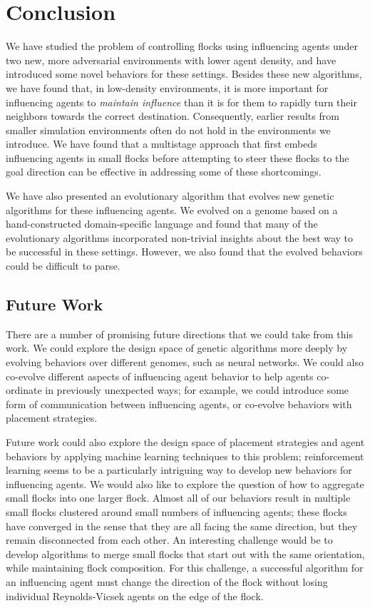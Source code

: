 \chapter{Conclusion}
\label{ch:conclusion}

We have studied the problem of controlling flocks using influencing agents
under two new, more adversarial environments with lower agent density, and
have introduced some novel behaviors for these settings.
Besides these new algorithms, we have found that, in low-density
environments, it is more important for influencing agents to
\textit{maintain influence} than it is for them to rapidly turn their
neighbors towards the correct destination.
Consequently, earlier results from smaller simulation environments often do
not hold in the environments we introduce.
We have found that a multistage approach that first embeds influencing
agents in small flocks before attempting to steer these flocks to the goal
direction can be effective in addressing some of these shortcomings.

We have also presented an evolutionary algorithm that evolves new genetic
algorithms for these influencing agents.
We evolved on a genome based on a hand-constructed domain-specific language
and found that many of the evolutionary algorithms incorporated non-trivial
insights about the best way to be successful in these settings.
However, we also found that the evolved behaviors could be difficult to parse.

\section*{Future Work}
There are a number of promising future directions that we could take from this
work.
We could explore the design space of genetic algorithms more deeply by
evolving behaviors over different genomes, such as neural networks.
We could also co-evolve different aspects of influencing agent behavior to help
agents co-ordinate in previously unexpected ways; for example, we could
introduce some form of communication between influencing agents, or co-evolve
behaviors with placement strategies.

Future work could also explore the design space of placement strategies and
agent behaviors by applying machine learning techniques to this problem;
reinforcement learning seems to be a particularly intriguing way to develop new
behaviors for influencing agents.
We would also like to explore the question of how to aggregate small flocks
into one larger flock.
Almost all of our behaviors result in multiple small flocks clustered around
small numbers of influencing agents; these flocks have converged in the sense
that they are all facing the same direction, but they remain disconnected from
each other.
An interesting challenge would be to develop algorithms to merge small flocks
that start out with the same orientation, while maintaining flock composition.
For this challenge, a successful algorithm for an influencing agent must change
the direction of the flock without losing individual Reynolds-Vicsek agents on
the edge of the flock.

